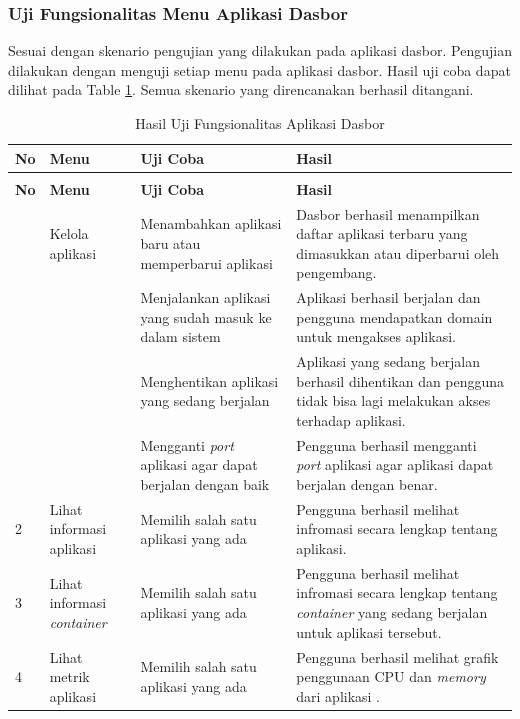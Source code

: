     	\subsubsection{Uji Fungsionalitas Menu Aplikasi Dasbor}
        	Sesuai dengan skenario pengujian yang dilakukan pada aplikasi dasbor. Pengujian dilakukan dengan menguji setiap menu pada aplikasi dasbor. Hasil uji coba dapat dilihat pada Table \ref{hasilUjiDasboard}. Semua skenario yang direncanakan berhasil ditangani.
        		\begin{longtable}{|p{}|p{}|p{}|p{}|}
						\caption{Hasil Uji Fungsionalitas Aplikasi Dasbor} \label{hasilUjiDasboard} \\
						\hline
						\textbf{No} & \textbf{Menu} & \textbf{Uji Coba} & \textbf{Hasil} \\ \hline
						\endfirsthead
						\caption[]{Hasil Uji Fungsionalitas Aplikasi Dasbor}  \\
						\hline
						\textbf{No} & \textbf{Menu} & \textbf{Uji Coba} & \textbf{Hasil} \\ \hline
						\endhead
						\endfoot
						\endlastfoot
						1 & Kelola aplikasi & Menambahkan aplikasi baru atau memperbarui aplikasi & Dasbor berhasil menampilkan daftar aplikasi terbaru yang dimasukkan atau diperbarui oleh pengembang. \\ \cline{3-4}
                        && Menjalankan aplikasi yang sudah masuk ke dalam sistem & Aplikasi berhasil berjalan dan pengguna mendapatkan domain untuk mengakses aplikasi. \\ \cline{3-4}
                        && Menghentikan aplikasi yang sedang berjalan & Aplikasi yang sedang berjalan berhasil dihentikan dan pengguna tidak bisa lagi melakukan akses terhadap aplikasi. \\ \cline{3-4}
                        && Mengganti \textit{port} aplikasi agar dapat berjalan dengan baik & Pengguna berhasil mengganti \textit{port} aplikasi agar aplikasi dapat berjalan dengan benar. \\ \hline
						2 & Lihat informasi aplikasi & Memilih salah satu aplikasi yang ada  & Pengguna berhasil melihat infromasi secara lengkap tentang aplikasi. \\ \hline
                        3 & Lihat informasi \textit{container} & Memilih salah satu aplikasi yang ada  & Pengguna berhasil melihat infromasi secara lengkap tentang \textit{container} yang sedang berjalan untuk aplikasi tersebut. \\ \hline
                        4 & Lihat metrik aplikasi & Memilih salah satu aplikasi yang ada  & Pengguna berhasil melihat grafik penggunaan CPU dan \textit{memory} dari aplikasi . \\ \hline
					\end{longtable}
    \pagebreak
